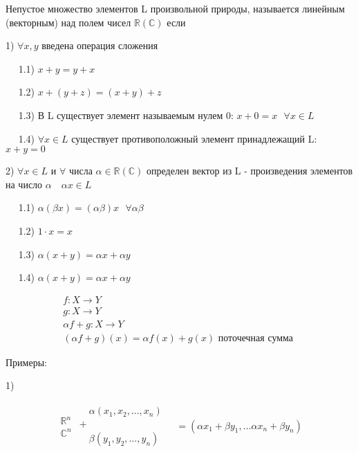 \documentclass[12pt, a4paper]{report}
\begin{document}
\begin{definition}
    Непустое множество элементов L произвольной природы, называется линейным (векторным) над полем чисел \( \mathbb{R} (\mathbb{C})\) если 

    1) \( \forall x,y   \) введена операция сложения 

    \( \quad  \) 1.1)  \( x+y = y+x \)
    
    \( \quad  \) 1.2) \( x+(y+z)= (x+y ) +z \)
    
    \( \quad  \) 1.3) В L существует элемент называемым нулем 0: \( x+0 = x \text{ }   \forall x \in  L \)  

    \( \quad  \) 1.4) \( \forall x \in  L \)  существует противоположный элемент принадлежащий L: \( x+y = 0 \) 

    2) \( \forall x \in  L \)  и \( \forall  \) числа \( \alpha \in  \mathbb{R}(\mathbb{C}) \) определен вектор из L - произведения элементов на число \( \alpha \quad \alpha x \in  L \)
    
    \( \quad  \) 1.1) \( \alpha (\beta x )= (\alpha \beta )x  \text{ } \forall  \alpha \beta  \)
    
    \( \quad  \) 1.2) \( 1 \cdot x =x  \)
    
    \( \quad  \) 1.3) \( \alpha (x+y) = \alpha x + \alpha y \)

    \( \quad  \) 1.4) \( \alpha( x+y ) = \alpha x + \alpha y \) 


\end{definition}


\begin{gather*}
    f: X \to  Y \\ 
    g: X \to  Y \\ 
    \alpha f + g : X \to  Y \\
    (\alpha f + g )(x)= \alpha f(x) + g(x)  \text{ поточечная сумма } 
\end{gather*}

Примеры: 

1)

\[ \begin{aligned}
\begin{array}{ll}
    \mathbb{R}^{n }\\
    \mathbb{C}^{n}  
\end{array}
\begin{array}{ll}
     \quad \alpha(x_1,x_2, \ldots, x_n) \\
    + \\
    \quad \beta (y_1,y_2, \ldots ,y_n )
\end{array}
\quad =(\alpha x_1 + \beta y_1 ,\dots \alpha x_n + \beta y_n)
\end{aligned} \] 
\end{document}
